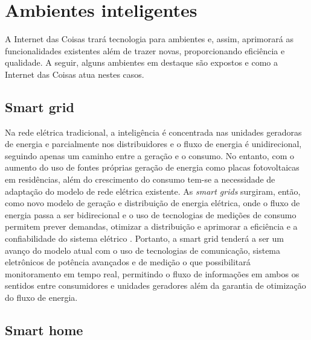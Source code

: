 \section{Ambientes inteligentes}

A Internet das Coisas trará tecnologia para ambientes e, assim, aprimorará as funcionalidades existentes além de trazer novas, proporcionando eficiência e qualidade. A seguir, alguns ambientes em destaque são expostos e como a Internet das Coisas atua nestes casos. 

\subsection{Smart grid}

Na rede elétrica tradicional, a inteligência é concentrada nas unidades geradoras de energia e parcialmente nos distribuidores e o fluxo de energia é unidirecional, seguindo apenas um caminho entre a geração e o consumo. No entanto, com o aumento do uso de fontes próprias geração de energia como placas fotovoltaicas em residências, além do crescimento do consumo tem-se a necessidade de adaptação do modelo de rede elétrica existente. As \textit{smart grids} surgiram, então, como novo modelo de geração e distribuição de energia elétrica, onde o fluxo de energia passa a ser bidirecional e o uso de tecnologias de medições de consumo permitem prever demandas, otimizar a distribuição e aprimorar a eficiência e a confiabilidade do sistema elétrico \cite{Cecilia2016}. Portanto, a smart grid tenderá a ser um avanço do modelo atual com o uso de tecnologias de comunicação, sistema eletrônicos de potência avançados e de medição o que possibilitará monitoramento em tempo real, permitindo o fluxo de informações em ambos os sentidos entre consumidores e unidades geradores além da garantia de otimização do fluxo de energia.


\subsection{Smart home}

